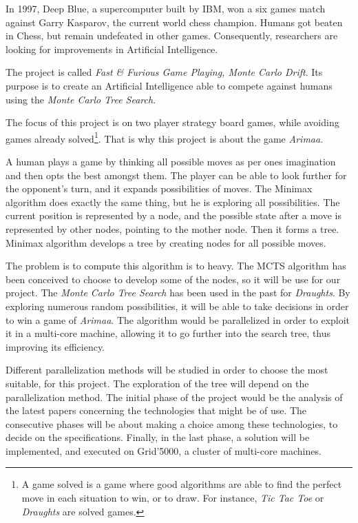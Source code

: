 
In 1997, Deep Blue, a supercomputer built by IBM, won a six games match against Garry Kasparov, the current world chess champion. Humans got beaten in Chess, but remain undefeated in other games. Consequently, researchers are looking for improvements in Artificial Intelligence.
\newline

The project is called \emph{Fast \& Furious Game Playing, Monte Carlo Drift}. Its purpose is to create an Artificial Intelligence able to compete against humans using the \emph{Monte Carlo Tree Search}.
\newline

The focus of this project is on two player strategy board games, while avoiding games already solved\footnote{A game solved is a game where good algorithms are able to find the perfect move in each situation to win, or to draw. For instance, \textit{Tic Tac Toe} or \textit{Draughts} are solved games.}. That is why this project is about the game \emph{Arimaa}.
\newline

A human plays a game by thinking all possible moves as per ones imagination and then opts the best amongst them. The player can be able to look further for the opponent's turn, and it expands possibilities of moves. The Minimax algorithm does exactly the same thing, but he is exploring all possibilities. The current position is represented by a node, and the possible state after a move is represented by other nodes, pointing to the mother node. Then it forms a tree.
Minimax algorithm develops a tree by creating nodes for all possible moves.
\newline

The problem is to compute this algorithm is to heavy. The MCTS algorithm has been conceived to choose to develop some of the nodes, so it will be use for our project.
The \emph{Monte Carlo Tree Search} has been used in the past for \textit{Draughts}. By exploring numerous random possibilities, it will be able to take decisions in order to win a game of \emph{Arimaa}.
The algorithm would be parallelized in order to exploit it in a multi-core machine, allowing it to go further into the search tree, thus improving its efficiency.
\newline

Different parallelization methods will be studied in order to choose the most suitable, for this project.
The exploration of the tree will depend on the parallelization method.
The initial phase of the project would be the analysis of the latest papers concerning the technologies that might be of use.
The consecutive phases will be about making a choice among these technologies, to decide on the specifications.
Finally, in the last phase, a solution will be implemented, and executed on Grid'5000, a cluster of multi-core machines.
\newline

